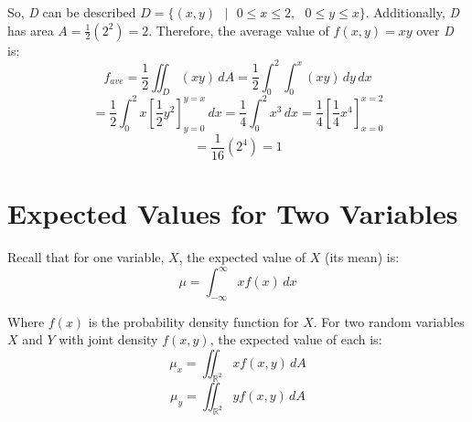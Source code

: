 \begin{Answer}[ref = avg]
\begin{enumerate}
So, \textit{D} can be described $\textit{D} = \{(x, y)\text{ }|\text{ }0 \leq 
x \leq 2,\text{ }0 \leq y \leq x\}$. Additionally, \textit{D} has area $A = 
\frac{1}{2} \left( 2^2 \right) = 2$. Therefore, the average value of $f(x,y) = 
xy$ over \textit{D} is:
$$f_{ave} = \frac{1}{2} \iint_{\textit{D}} \left(xy \right)\,dA = \frac{1}{2} 
\int_0^2 \int_0^x \left(xy \right)\,dy\,dx$$
$$= \frac{1}{2} \int_0^2 x \left[ \frac{1}{2}y^2 \right]_{y = 0}^{y = x}\,dx = 
\frac{1}{4} \int_0^2 x^3\,dx = \frac{1}{4} \left[ \frac{1}{4}x^4 \right]_{x = 0
}^{x = 2}$$
$$= \frac{1}{16} \left(2^4 \right) = 1$$
\end{enumerate}
\end{Answer}

\section{Expected Values for Two Variables}
Recall that for one variable, $X$, the expected value of $X$ (its mean) is:
$$\mu = \int_{- \infty}^{\infty} xf(x)\,dx$$

Where $f(x)$ is the probability density function for $X$. For two random variables $X$ and $Y$ with joint density
$f(x, y)$, the expected value of each is:
$$\mu_x = \iint_{\mathbb{R}^2} xf(x, y)\,dA$$
$$\mu_y = \iint_{\mathbb{R}^2} yf(x, y)\,dA$$

